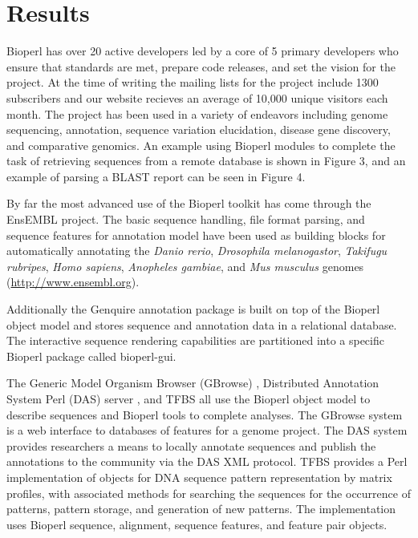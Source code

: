 \documentclass[12pt]{article}
\begin{document}
\section{Results}

Bioperl has over 20 active developers led by a core of 5 primary developers
who ensure that standards are met, prepare code releases, and set the
vision for the project.  At the time of writing the mailing lists
for the project include 1300 subscribers and our website recieves an
average of 10,000 unique visitors each month.  The project has been used
in a variety of endeavors including genome sequencing, annotation,
sequence variation elucidation, disease gene discovery, and
comparative genomics.  An example using Bioperl modules to complete
the task of retrieving sequences from a remote database is
shown in Figure 3, and an example of parsing a BLAST report can be
seen in Figure 4.

By far the most advanced use of the Bioperl toolkit has come through
the EnsEMBL \cite{ensembl-nar} project.  The basic sequence handling,
file format parsing, and sequence features for annotation model have
been used as building blocks for automatically annotating the
\textit{Danio rerio}, \textit{Drosophila melanogastor},
\textit{Takifugu rubripes}, \textit{Homo sapiens}, \textit{Anopheles
gambiae}, and \textit{Mus musculus} genomes
(\url{http://www.ensembl.org}).

Additionally the Genquire \cite{genquire} annotation package is built
on top of the Bioperl object model and stores sequence and annotation
data in a relational database.  The interactive sequence rendering
capabilities are partitioned into a specific Bioperl package called
bioperl-gui.

The Generic Model Organism Browser (GBrowse) \cite{gmod}, Distributed
Annotation System Perl (DAS) server \cite{das}, and TFBS \cite{tfbs}
all use the Bioperl object model to describe sequences and Bioperl
tools to complete analyses.  The GBrowse system is a web interface to
databases of features for a genome project.  The DAS system provides
researchers a means to locally annotate sequences and publish the
annotations to the community via the DAS XML protocol.  TFBS provides
a Perl implementation of objects for DNA sequence pattern
representation by matrix profiles, with associated methods for
searching the sequences for the occurrence of patterns, pattern
storage, and generation of new patterns. The implementation uses
Bioperl sequence, alignment, sequence features, and feature pair
objects.
\end{document}
